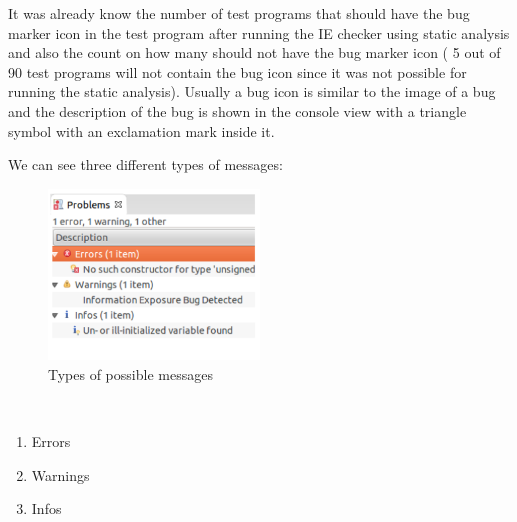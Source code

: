 It was already know the number of test programs that should have the bug marker icon in the
test program after running the IE checker using static analysis and 
also the count on how many should not have the bug marker icon ( 5 out of 90 test
programs will not contain the bug icon since it was not possible for running the
static analysis). Usually a bug icon is similar to the image of a bug and the description of the
bug is shown in the console view with a triangle symbol with an exclamation mark inside it.

We can see three different types of messages:
\begin{figure}[!htb]
\centering
\includegraphics[width=0.5\textwidth]{png/Types.png}
\caption{Types of possible messages}
\label{fig:types}
\end{figure}\\

\begin{enumerate}
\item Errors
\item Warnings
\item Infos
\end{enumerate}

